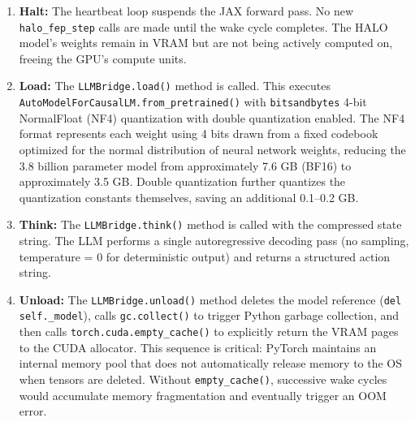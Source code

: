 \begin{enumerate}
    \item \textbf{Halt:} The heartbeat loop suspends the JAX forward pass. No new \texttt{halo\_fep\_step} calls are made until the wake cycle completes. The HALO model's weights remain in VRAM but are not being actively computed on, freeing the GPU's compute units.

    \item \textbf{Load:} The \texttt{LLMBridge.load()} method is called. This executes \texttt{AutoModelForCausalLM.from\_pretrained()} with \texttt{bitsandbytes} 4-bit NormalFloat (NF4) quantization with double quantization enabled. The NF4 format represents each weight using 4 bits drawn from a fixed codebook optimized for the normal distribution of neural network weights, reducing the 3.8 billion parameter model from approximately 7.6 GB (BF16) to approximately 3.5 GB. Double quantization further quantizes the quantization constants themselves, saving an additional 0.1--0.2 GB.

    \item \textbf{Think:} The \texttt{LLMBridge.think()} method is called with the compressed state string. The LLM performs a single autoregressive decoding pass (no sampling, temperature = 0 for deterministic output) and returns a structured action string.

    \item \textbf{Unload:} The \texttt{LLMBridge.unload()} method deletes the model reference (\texttt{del self.\_model}), calls \texttt{gc.collect()} to trigger Python garbage collection, and then calls \texttt{torch.cuda.empty\_cache()} to explicitly return the VRAM pages to the CUDA allocator. This sequence is critical: PyTorch maintains an internal memory pool that does not automatically release memory to the OS when tensors are deleted. Without \texttt{empty\_cache()}, successive wake cycles would accumulate memory fragmentation and eventually trigger an OOM error.
\end{enumerate}

